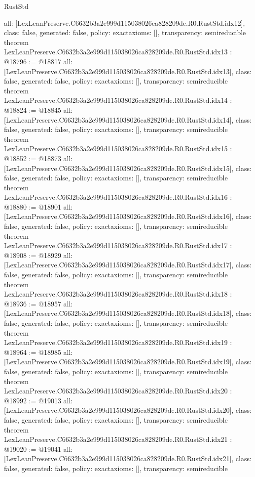\begin{lexlean}{RustStd}
\begin{coremodule}
{  all: [LexLeanPreserve.C6632b3a2e999d115038026ca828209de.R0.RustStd.idx12],
  class: false,
  generated: false,
  policy: exact{axioms: []},
  transparency: semireducible
}
theorem LexLeanPreserve.C6632b3a2e999d115038026ca828209de.R0.RustStd.idx13 : @18796 := @18817 {
  all: [LexLeanPreserve.C6632b3a2e999d115038026ca828209de.R0.RustStd.idx13],
  class: false,
  generated: false,
  policy: exact{axioms: []},
  transparency: semireducible
}
theorem LexLeanPreserve.C6632b3a2e999d115038026ca828209de.R0.RustStd.idx14 : @18824 := @18845 {
  all: [LexLeanPreserve.C6632b3a2e999d115038026ca828209de.R0.RustStd.idx14],
  class: false,
  generated: false,
  policy: exact{axioms: []},
  transparency: semireducible
}
theorem LexLeanPreserve.C6632b3a2e999d115038026ca828209de.R0.RustStd.idx15 : @18852 := @18873 {
  all: [LexLeanPreserve.C6632b3a2e999d115038026ca828209de.R0.RustStd.idx15],
  class: false,
  generated: false,
  policy: exact{axioms: []},
  transparency: semireducible
}
theorem LexLeanPreserve.C6632b3a2e999d115038026ca828209de.R0.RustStd.idx16 : @18880 := @18901 {
  all: [LexLeanPreserve.C6632b3a2e999d115038026ca828209de.R0.RustStd.idx16],
  class: false,
  generated: false,
  policy: exact{axioms: []},
  transparency: semireducible
}
theorem LexLeanPreserve.C6632b3a2e999d115038026ca828209de.R0.RustStd.idx17 : @18908 := @18929 {
  all: [LexLeanPreserve.C6632b3a2e999d115038026ca828209de.R0.RustStd.idx17],
  class: false,
  generated: false,
  policy: exact{axioms: []},
  transparency: semireducible
}
theorem LexLeanPreserve.C6632b3a2e999d115038026ca828209de.R0.RustStd.idx18 : @18936 := @18957 {
  all: [LexLeanPreserve.C6632b3a2e999d115038026ca828209de.R0.RustStd.idx18],
  class: false,
  generated: false,
  policy: exact{axioms: []},
  transparency: semireducible
}
theorem LexLeanPreserve.C6632b3a2e999d115038026ca828209de.R0.RustStd.idx19 : @18964 := @18985 {
  all: [LexLeanPreserve.C6632b3a2e999d115038026ca828209de.R0.RustStd.idx19],
  class: false,
  generated: false,
  policy: exact{axioms: []},
  transparency: semireducible
}
theorem LexLeanPreserve.C6632b3a2e999d115038026ca828209de.R0.RustStd.idx20 : @18992 := @19013 {
  all: [LexLeanPreserve.C6632b3a2e999d115038026ca828209de.R0.RustStd.idx20],
  class: false,
  generated: false,
  policy: exact{axioms: []},
  transparency: semireducible
}
theorem LexLeanPreserve.C6632b3a2e999d115038026ca828209de.R0.RustStd.idx21 : @19020 := @19041 {
  all: [LexLeanPreserve.C6632b3a2e999d115038026ca828209de.R0.RustStd.idx21],
  class: false,
  generated: false,
  policy: exact{axioms: []},
  transparency: semireducible
}
\end{coremodule}
\end{lexlean}
